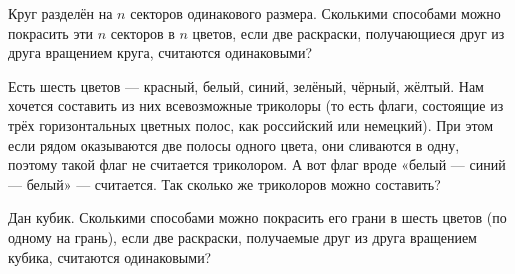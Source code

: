 ﻿
\begin{enumerate}
\itA Круг разделён на $n$ секторов одинакового размера. Сколькими способами можно покрасить эти $n$ секторов в $n$ цветов, если две раскраски, получающиеся друг из друга вращением круга, считаются одинаковыми?

\itB Есть шесть цветов — красный, белый, синий, зелёный, чёрный, жёлтый. Нам хочется составить из них всевозможные триколоры (то есть флаги, состоящие из трёх горизонтальных цветных полос, как российский или немецкий). При этом если рядом оказываются две полосы одного цвета, они сливаются в одну, поэтому такой флаг не считается триколором. А вот флаг вроде «белый — синий — белый» — считается. Так сколько же триколоров можно составить?

\itC Дан кубик. Сколькими способами можно покрасить его грани в шесть цветов (по одному на грань), если две раскраски, получаемые друг из друга вращением кубика, считаются одинаковыми?
\end{enumerate}
